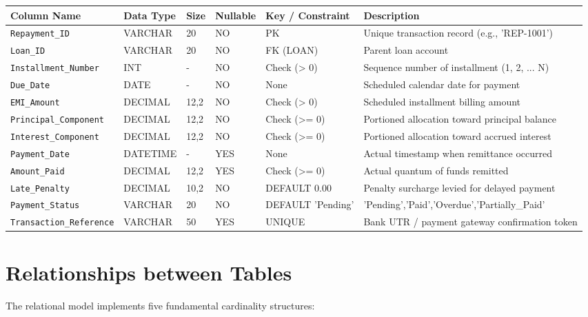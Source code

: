 \documentclass[12pt,a4paper,oneside]{report}
\begin{document}
\begin{table}[htbp]
\centering
\small
\begin{tabularx}{\textwidth}{p{2.5cm} X X X X X}
\toprule
\textbf{Column Name} & \textbf{Data Type} & \textbf{Size} & \textbf{Nullable} & \textbf{Key / Constraint} & \textbf{Description} \\
\midrule
\texttt{Repayment\_ID} & VARCHAR & 20 & NO & PK & Unique transaction record (e.g., 'REP-1001') \\
\texttt{Loan\_ID} & VARCHAR & 20 & NO & FK (LOAN) & Parent loan account \\
\texttt{Installment\_Number} & INT & - & NO & Check (> 0) & Sequence number of installment (1, 2, ... N) \\
\texttt{Due\_Date} & DATE & - & NO & None & Scheduled calendar date for payment \\
\texttt{EMI\_Amount} & DECIMAL & 12,2 & NO & Check (> 0) & Scheduled installment billing amount \\
\texttt{Principal\_Component} & DECIMAL & 12,2 & NO & Check (>= 0) & Portioned allocation toward principal balance \\
\texttt{Interest\_Component} & DECIMAL & 12,2 & NO & Check (>= 0) & Portioned allocation toward accrued interest \\
\texttt{Payment\_Date} & DATETIME & - & YES & None & Actual timestamp when remittance occurred \\
\texttt{Amount\_Paid} & DECIMAL & 12,2 & YES & Check (>= 0) & Actual quantum of funds remitted \\
\texttt{Late\_Penalty} & DECIMAL & 10,2 & NO & DEFAULT 0.00 & Penalty surcharge levied for delayed payment \\
\texttt{Payment\_Status} & VARCHAR & 20 & NO & DEFAULT 'Pending' & 'Pending','Paid','Overdue','Partially\_Paid' \\
\texttt{Transaction\_Reference} & VARCHAR & 50 & YES & UNIQUE & Bank UTR / payment gateway confirmation token \\
\bottomrule
\end{tabularx}
\end{table}

\section{Relationships between Tables}

The relational model implements five fundamental cardinality structures:
\end{document}
